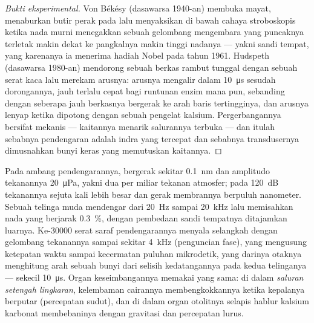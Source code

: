 \begin{proof}[Bukti eksperimental]
Von Békésy (dasawarsa 1940-an) membuka  mayat, menaburkan
butir perak pada  lalu menyaksikan di bawah
cahaya stroboskopis ketika nada murni menegakkan sebuah gelombang mengembara yang puncaknya
terletak makin dekat ke pangkalnya makin tinggi nadanya --- yakni sandi tempat, yang karenanya
ia menerima hadiah Nobel pada tahun 1961. Hudspeth (dasawarsa 1980-an) mendorong sebuah
berkas rambut tunggal dengan sebuah serat kaca lalu merekam arusnya: arusnya mengalir
dalam \qty{10}{\micro s} sesudah dorongannya, jauh terlalu cepat bagi runtunan enzim mana pun,
sebanding dengan seberapa jauh berkasnya bergerak ke arah baris tertingginya,
dan arusnya lenyap ketika  dipotong dengan sebuah pengelat
kalsium. Pergerbangannya bersifat mekanis --- kaitannya menarik salurannya terbuka ---
dan itulah sebabnya pendengaran adalah indra yang tercepat dan sebabnya
transdusernya dimusnahkan bunyi keras yang memutuskan kaitannya.
\end{proof}

\begin{example}\label{ex:b3:sensory-systems:ear-numbers}
Pada ambang pendengarannya,  bergerak sekitar
\qty{0.1}{nm} dan amplitudo tekanannya \qty{20}{\micro Pa}, yakni
dua per miliar tekanan atmosfer; pada \qty{120}{dB} tekanannya
sejuta kali lebih besar dan gerak membrannya berpuluh nanometer. Sebuah
telinga muda mendengar dari \qty{20}{Hz} sampai \qty{20}{kHz} lalu memisahkan nada
yang berjarak \qty{0.3}{\%}, dengan pembedaan sandi tempatnya ditajamkan
 luarnya. Ke-\num{30000} serat saraf pendengarannya menyala selangkah
dengan gelombang tekanannya sampai sekitar \qty{4}{kHz} (penguncian fase),
yang mengusung ketepatan waktu sampai kecermatan puluhan mikrodetik, yang darinya
otaknya menghitung arah sebuah bunyi dari selisih kedatangannya pada
kedua telinganya --- sekecil \qty{10}{\micro s}. Organ keseimbangannya memakai
 yang sama: di dalam \emph{saluran setengah lingkaran}, kelembaman
cairannya membengkokkannya ketika kepalanya berputar (percepatan sudut), dan di dalam
organ otolitnya selapis hablur kalsium karbonat membebaninya
dengan gravitasi dan percepatan lurus.
\end{example}

